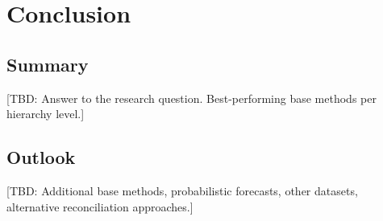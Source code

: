\section{Conclusion}\label{sec:conclusion}

\subsection{Summary}\label{sec:summary}

[TBD: Answer to the research question. Best-performing base methods per hierarchy level.]

\subsection{Outlook}\label{sec:outlook}

[TBD: Additional base methods, probabilistic forecasts, other datasets, alternative reconciliation approaches.]
